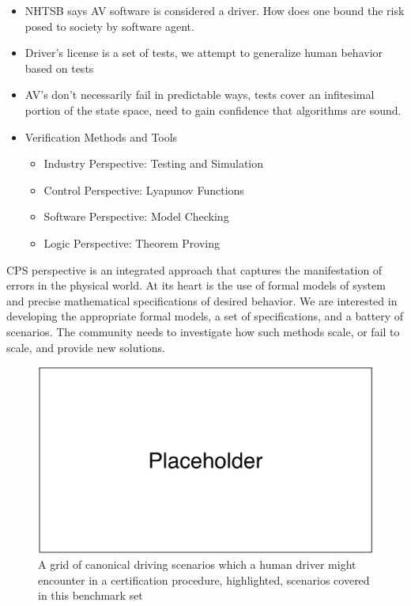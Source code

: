 \documentclass{easychair}
\theoremstyle{theorem}
\theoremstyle{remark}
\begin{document}
\begin{itemize}
	\item NHTSB says AV software is considered a driver. How does one bound the risk posed to society by software agent. 
	\item Driver's license is a set of tests, we attempt to generalize human behavior based on tests
	\item AV's don't necessarily fail in predictable ways, tests cover an infitesimal portion of the state space, need to gain confidence that algorithms are sound.
	\item Verification Methods and Tools
	\begin{itemize}
		\item Industry Perspective: Testing and Simulation
		\item Control Perspective: Lyapunov Functions
		\item Software Perspective: Model Checking
		\item Logic Perspective: Theorem Proving
	\end{itemize}
\end{itemize}
CPS perspective is an integrated approach that captures the manifestation of errors in the physical world. At its heart is the use of formal models of system and precise mathematical specifications of desired behavior. We are interested in developing the appropriate formal models, a set of specifications, and a battery of scenarios. The community needs to investigate how such methods scale, or fail to scale, and provide new solutions.

\begin{figure}
	\centering
	\includegraphics[scale=0.5]{figures/placeholder}
	\caption{A grid of canonical driving scenarios which a human driver might encounter in a certification procedure, highlighted, scenarios covered in this benchmark set}
\end{figure}
\end{document}
